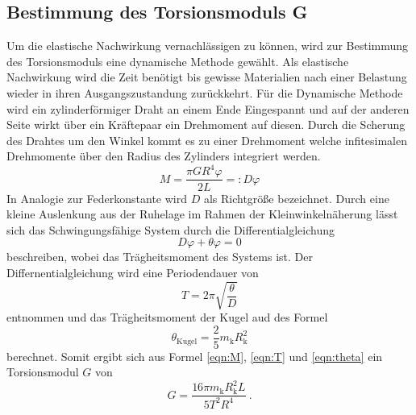 \subsection{Bestimmung des Torsionsmoduls G}
Um die elastische Nachwirkung vernachlässigen zu können, wird zur Bestimmung des Torsionsmoduls eine dynamische Methode gewählt. Als elastische Nachwirkung wird die Zeit benötigt bis gewisse Materialien nach einer Belastung wieder in ihren Ausgangszustandung zurückkehrt.
Für die Dynamische Methode wird ein zylinderförmiger Draht an einem Ende Eingespannt und auf der anderen Seite wirkt über ein Kräftepaar ein Drehmoment auf diesen. Durch die Scherung des Drahtes um den Winkel \alpha kommt es zu einer Drehmoment welche infitesimalen Drehmomente über den Radius des Zylinders  integriert werden.
\begin{equation}
  M = \frac{\pi G R^4 \varphi}{2L} =: D \varphi
  \label{eqn:M}
\end{equation}
In Analogie zur Federkonstante wird $D$ als Richtgröße bezeichnet. Durch eine kleine Auslenkung aus der Ruhelage im Rahmen der Kleinwinkelnäherung lässt sich das Schwingungsfähige System durch die Differentialgleichung
\begin{equation}
  D \varphi + \theta \varphi = 0
  \label{eqn:dgl}
\end{equation}
beschreiben, wobei \theta das Trägheitsmoment des Systems ist. Der Differnentialgleichung wird eine Periodendauer von
\begin{equation}
  T = 2 \pi \sqrt{\frac{\theta}{D}}
  \label{eqn:T}
\end{equation}
entnommen und das Trägheitsmoment der Kugel aud des Formel
\begin{equation}
  \theta_\text{Kugel} = \frac{2}{5}m_\text{k}R_\text{k}^2
  \label{eqn:theta}
\end{equation}
berechnet. Somit ergibt sich aus Formel \ref{eqn:M}, \ref{eqn:T} und \ref{eqn:theta} ein Torsionsmodul $G$ von
\begin{equation}
  G = \frac{16 \pi m_\text{k} R_\text{k}^2 L}{5 T^2 R^4} \ .
  \label{eqn:G}
\end{equation}
